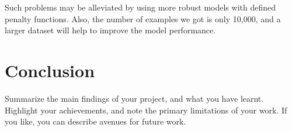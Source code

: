 \documentclass{article}
\begin{document}
Such problems may be alleviated by using more robust models with defined penalty functions. Also, the number of examples we got is only 10,000, and a larger dataset will help to improve the model performance.

\section{Conclusion}
Summarize the main findings of your project, and what you have learnt. Highlight your achievements, and note the primary limitations of your work. If you like, you can describe avenues for future work.




\end{document}
